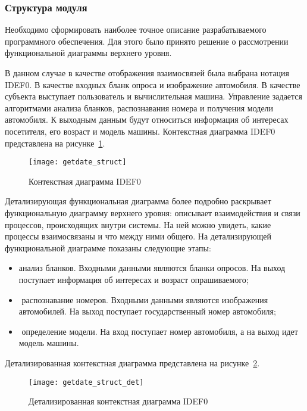 \subsubsection{Структура модуля}

Необходимо сформировать наиболее точное описание разрабатываемого программного обеспечения. Для этого было принято решение о рассмотрении функциональной диаграммы верхнего уровня.

В данном случае в качестве отображения взаимосвязей была выбрана нотация IDEF0. В качестве входных бланк опроса и изображение автомобиля. В качестве субъекта выступает пользователь и вычислительная машина. Управление задается алгоритмами анализа бланков, распознавания номера и получения модели автомобиля. К выходным данным будут относиться информация об интересах посетителя, его возраст и модель машины.
Контекстная диаграмма IDEF0 представлена на рисунке~\ref{f:getdate_struct}.

\begin{figure}[ht]
	\centering
	\vspace{\toppaddingoffigure}
	\texttt{[image: getdate\_struct]}
	\caption{Контекстная диаграмма IDEF0}
	\label{f:getdate_struct}
\end{figure}

Детализирующая функциональная диаграмма более подробно раскрывает функциональную диаграмму верхнего уровня: описывает взаимодействия и связи процессов, происходящих внутри системы. На ней можно увидеть, какие процессы взаимосвязаны и что между ними общего.
На детализирующей функциональной диаграмме показаны следующие этапы:

\begin{itemize}
    \item анализ бланков. Входными данными являются бланки опросов. На выход поступает информация об интересах и возраст опрашиваемого;
    \item­ распознавание номеров. Входными данными являются изображения автомобилей. На выход поступает государственный номер автомобиля;
    \item­ определение модели. На вход поступает номер автомобиля, а на выход идет модель машины.
\end{itemize}

Детализированная контекстная диаграмма представлена на рисунке~\ref{f:getdate_struct_det}.
\begin{figure}[ht]
	\centering
	\vspace{\toppaddingoffigure}
	\texttt{[image: getdate\_struct\_det]}
	\caption{Детализированная контекстная диаграмма IDEF0}
	\label{f:getdate_struct_det}
\end{figure}

